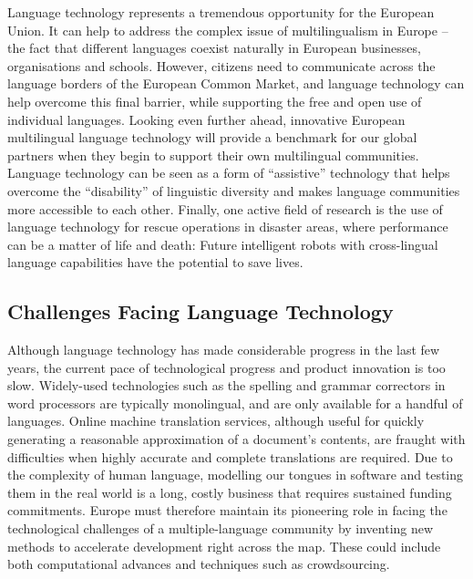 \begin{multicols}{2}

Language technology represents a tremendous opportunity for the European Union. It can help to address the complex issue of multilingualism in Europe – the fact that different languages coexist naturally in European businesses, organisations and schools. However, citizens need to communicate across the language borders of the European Common Market, and language technology can help overcome this final barrier, while supporting the free and open use of individual languages. Looking even further ahead, innovative European multilingual language technology will provide a benchmark for our global partners when they begin to support their own multilingual communities. Language technology can be seen as a form of “assistive” technology that helps overcome the “disability” of linguistic diversity and makes language communities more accessible to each other. Finally, one active field of research is the use of language technology for rescue operations in disaster areas, where performance can be a matter of life and death: Future intelligent robots with cross-lingual language capabilities have the potential to save lives.

\subsection{Challenges Facing Language Technology}

Although language technology has made considerable progress in the last few years, the current pace of technological progress and product innovation is too slow. Widely-used technologies such as the spelling and grammar correctors in word processors are typically monolingual, and are only available for a handful of languages. Online machine translation services, although useful for quickly generating a reasonable approximation of a document’s contents, are fraught with difficulties when highly accurate and complete translations are required. Due to the complexity of human language, modelling our tongues in software and testing them in the real world is a long, costly business that requires sustained funding commitments. Europe must therefore maintain its pioneering role in facing the technological challenges of a multiple-language community by inventing new methods to accelerate development right across the map. These could include both computational advances and techniques such as crowdsourcing.


\end{multicols}
